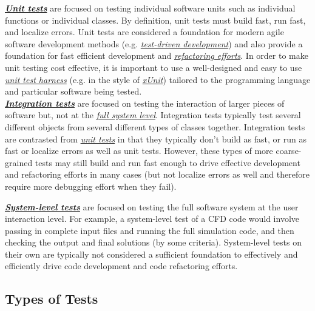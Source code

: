 \documentclass[]{article}
\begin{document}
\protect\hypertarget{id.5saje75168fl}{}{}\textbf{\href{http://en.wikipedia.org/wiki/Unit_testing}{\emph{Unit
tests}}} are focused on testing individual software units such as
individual functions or individual classes. By definition, unit tests
must build fast, run fast, and localize errors. Unit tests are
considered a foundation for modern agile software development methods
(e.g.
\href{http://en.wikipedia.org/wiki/Test-driven_development}{\emph{test-driven
development}}) and also provide a foundation for fast efficient
development and
\href{http://en.wikipedia.org/wiki/Code_refactoring}{\emph{refactoring
efforts}}. In order to make unit testing cost effective, it is important
to use a well-designed and easy to use
\href{https://en.wikipedia.org/wiki/Test_harness}{\emph{unit test
harness}} (e.g. in the style of
\href{http://en.wikipedia.org/wiki/XUnit}{\emph{xUnit}}) tailored to the
programming language and particular software being tested.\\
\protect\hypertarget{id.j931ebv6xsmb}{}{}\href{http://en.wikipedia.org/wiki/Integration_testing}{\textbf{\emph{Integration
tests}}} are focused on testing the interaction of larger pieces of
software but, not at the \protect\hyperlink{id.vllu2z1lvhtb}{\emph{full
system level}}. Integration tests typically test several different
objects from several different types of classes together. Integration
tests are contrasted from \protect\hyperlink{id.5saje75168fl}{\emph{unit
tests}} in that they typically don't build as fast, or run as fast or
localize errors as well as unit tests. However, these types of more
coarse-grained tests may still build and run fast enough to drive
effective development and refactoring efforts in many cases (but not
localize errors as well and therefore require more debugging effort when
they fail).

\protect\hypertarget{id.vllu2z1lvhtb}{}{}\textbf{\href{http://en.wikipedia.org/wiki/System_testing}{\emph{System-level
tests}}} are focused on testing the full software system at the user
interaction level. For example, a system-level test of a CFD code would
involve passing in complete input files and running the full simulation
code, and then checking the output and final solutions (by some
criteria). System-level tests on their own are typically not considered
a sufficient foundation to effectively and efficiently drive code
development and code refactoring efforts.

\hypertarget{types-of-tests}{\subsection{Types of
Tests}\label{types-of-tests}}
\end{document}
